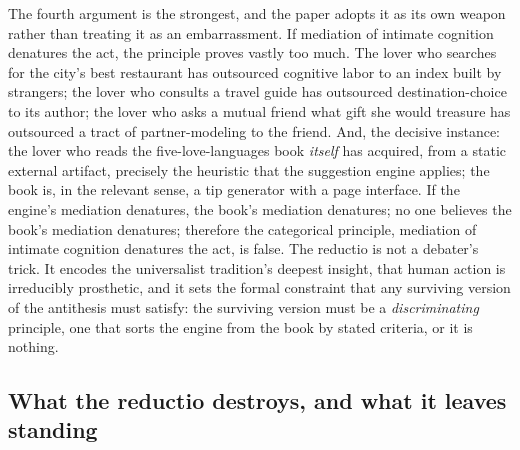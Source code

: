 The fourth argument is the strongest, and the paper adopts it as its own weapon rather than treating it as an embarrassment. If mediation of intimate cognition denatures the act, the principle proves vastly too much. The lover who searches for the city's best restaurant has outsourced cognitive labor to an index built by strangers; the lover who consults a travel guide has outsourced destination-choice to its author; the lover who asks a mutual friend what gift she would treasure has outsourced a tract of partner-modeling to the friend. And, the decisive instance: the lover who reads the five-love-languages book \emph{itself} has acquired, from a static external artifact, precisely the heuristic that the suggestion engine applies; the book is, in the relevant sense, a tip generator with a page interface. If the engine's mediation denatures, the book's mediation denatures; no one believes the book's mediation denatures; therefore the categorical principle, mediation of intimate cognition denatures the act, is false. The reductio is not a debater's trick. It encodes the universalist tradition's deepest insight, that human action is irreducibly prosthetic, and it sets the formal constraint that any surviving version of the antithesis must satisfy: the surviving version must be a \emph{discriminating} principle, one that sorts the engine from the book by stated criteria, or it is nothing.

\subsection{What the reductio destroys, and what it leaves standing}
\label{p02:sec:thesis-aftermath}

